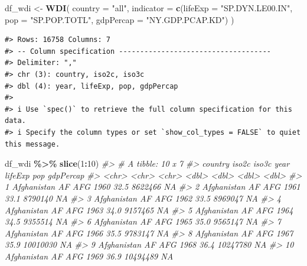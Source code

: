 \documentclass[
  xelatex, ja=standard]{bxjsbook}
\newenvironment{Shaded}{\begin{snugshade}}{\end{snugshade}}
\newcommand{\AttributeTok}[1]{\textcolor[rgb]{0.13,0.29,0.53}{#1}}
\newcommand{\CommentTok}[1]{\textcolor[rgb]{0.56,0.35,0.01}{\textit{#1}}}
\newcommand{\DecValTok}[1]{\textcolor[rgb]{0.00,0.00,0.81}{#1}}
\newcommand{\FunctionTok}[1]{\textcolor[rgb]{0.13,0.29,0.53}{\textbf{#1}}}
\newcommand{\NormalTok}[1]{#1}
\newcommand{\OtherTok}[1]{\textcolor[rgb]{0.56,0.35,0.01}{#1}}
\newcommand{\SpecialCharTok}[1]{\textcolor[rgb]{0.81,0.36,0.00}{\textbf{#1}}}
\newcommand{\StringTok}[1]{\textcolor[rgb]{0.31,0.60,0.02}{#1}}
\theoremstyle{definition}
\theoremstyle{definition}
\theoremstyle{definition}
\theoremstyle{definition}
\theoremstyle{remark}
\begin{document}
\begin{Shaded}
\begin{Highlighting}[]
\NormalTok{df\_wdi }\OtherTok{\textless{}{-}} \FunctionTok{WDI}\NormalTok{(}
  \AttributeTok{country =} \StringTok{"all"}\NormalTok{, }
  \AttributeTok{indicator =} \FunctionTok{c}\NormalTok{(}\AttributeTok{lifeExp =} \StringTok{"SP.DYN.LE00.IN"}\NormalTok{, }\AttributeTok{pop =} \StringTok{"SP.POP.TOTL"}\NormalTok{, }\AttributeTok{gdpPercap =} \StringTok{"NY.GDP.PCAP.KD"}\NormalTok{)}
\NormalTok{)}
\end{Highlighting}
\end{Shaded}

\begin{verbatim}
#> Rows: 16758 Columns: 7
#> -- Column specification ------------------------------------
#> Delimiter: ","
#> chr (3): country, iso2c, iso3c
#> dbl (4): year, lifeExp, pop, gdpPercap
#> 
#> i Use `spec()` to retrieve the full column specification for this data.
#> i Specify the column types or set `show_col_types = FALSE` to quiet this message.
\end{verbatim}

\begin{Shaded}
\begin{Highlighting}[]
\NormalTok{df\_wdi }\SpecialCharTok{\%\textgreater{}\%} \FunctionTok{slice}\NormalTok{(}\DecValTok{1}\SpecialCharTok{:}\DecValTok{10}\NormalTok{)}
\CommentTok{\#\textgreater{} \# A tibble: 10 x 7}
\CommentTok{\#\textgreater{}    country     iso2c iso3c  year lifeExp      pop gdpPercap}
\CommentTok{\#\textgreater{}    \textless{}chr\textgreater{}       \textless{}chr\textgreater{} \textless{}chr\textgreater{} \textless{}dbl\textgreater{}   \textless{}dbl\textgreater{}    \textless{}dbl\textgreater{}     \textless{}dbl\textgreater{}}
\CommentTok{\#\textgreater{}  1 Afghanistan AF    AFG    1960    32.5  8622466        NA}
\CommentTok{\#\textgreater{}  2 Afghanistan AF    AFG    1961    33.1  8790140        NA}
\CommentTok{\#\textgreater{}  3 Afghanistan AF    AFG    1962    33.5  8969047        NA}
\CommentTok{\#\textgreater{}  4 Afghanistan AF    AFG    1963    34.0  9157465        NA}
\CommentTok{\#\textgreater{}  5 Afghanistan AF    AFG    1964    34.5  9355514        NA}
\CommentTok{\#\textgreater{}  6 Afghanistan AF    AFG    1965    35.0  9565147        NA}
\CommentTok{\#\textgreater{}  7 Afghanistan AF    AFG    1966    35.5  9783147        NA}
\CommentTok{\#\textgreater{}  8 Afghanistan AF    AFG    1967    35.9 10010030        NA}
\CommentTok{\#\textgreater{}  9 Afghanistan AF    AFG    1968    36.4 10247780        NA}
\CommentTok{\#\textgreater{} 10 Afghanistan AF    AFG    1969    36.9 10494489        NA}
\end{Highlighting}
\end{Shaded}
\end{document}
